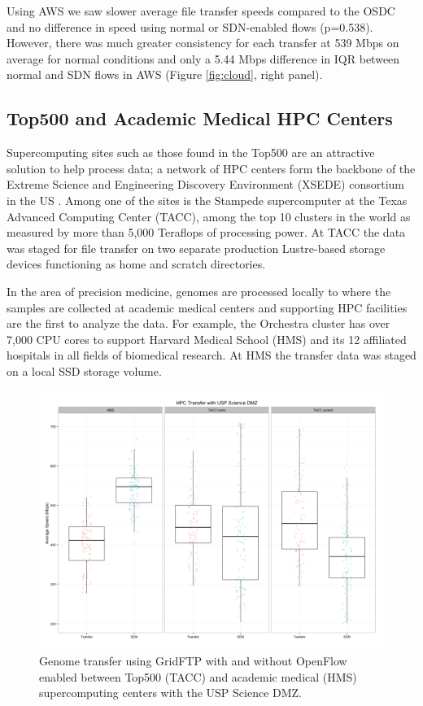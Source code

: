 \documentclass{sig-alternate-05-2015}
\begin{document}
Using AWS we saw slower average file transfer speeds compared to the OSDC and no difference in speed using normal or SDN-enabled flows (p=0.538). However, there was much greater consistency for each transfer at 539 Mbps on average for normal conditions and only a 5.44 Mbps difference in IQR between normal and SDN flows in AWS (Figure \ref{fig:cloud}, right panel).

\subsection{Top500 and Academic Medical HPC Centers}

Supercomputing sites such as those found in the Top500 are an attractive solution to help process data; a network of HPC centers form the backbone of the Extreme Science and Engineering Discovery Environment (XSEDE) consortium in the US \cite{Towns2014}. Among one of the sites is the Stampede supercomputer at the Texas Advanced Computing Center (TACC), among the top 10 clusters in the world as measured by more than 5,000 Teraflops of processing power. At TACC the data was staged for file transfer on two separate production Lustre-based storage devices functioning as home and scratch directories. 

In the area of precision medicine, genomes are processed locally to where the samples are collected at academic medical centers and supporting HPC facilities are the first to analyze the data. For example, the Orchestra cluster has over 7,000 CPU cores to support Harvard Medical School (HMS) and its 12 affiliated hospitals in all fields of biomedical research. At HMS the transfer data was staged on a local SSD storage volume.

\begin{figure}
\centering
\includegraphics[scale=0.23]{images/hpc.png}
\caption{Genome transfer using GridFTP with and without OpenFlow enabled between Top500 (TACC) and academic medical (HMS) supercomputing centers with the USP Science DMZ.}
\label{fig:hpc}
\end{figure}
\end{document}
